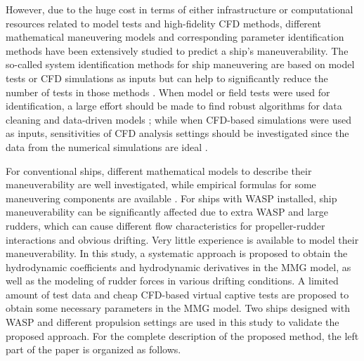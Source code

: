 However, due to the huge cost in terms of either infrastructure or computational resources related to model tests and high-fidelity CFD methods, different mathematical maneuvering models and corresponding parameter identification methods have been extensively studied to predict a ship’s maneuverability. The so-called system identification methods for ship maneuvering are based on model tests or CFD simulations as inputs but can help to significantly reduce the number of tests in those methods \citep{lokukalugep.pereraSystemIdentificationVessel2016,alexanderssonSystemIdentificationPhysicsinformed2024b}. When model or field tests were used for identification, a large effort should be made to find robust algorithms for data cleaning and data-driven models \citep{revestidoherreroTwostepIdentificationNonlinear2012,alexanderssonSystemIdentificationVessel2022,duShipManeuveringPrediction2022}; while when CFD-based simulations were used as inputs, sensitivities of CFD analysis settings should be investigated since the data from the numerical simulations are ideal \citep{liuPredictionsShipManeuverability2018}.

For conventional ships, different mathematical models to describe their maneuverability are well investigated, while empirical formulas for some maneuvering components are available \citep{yasukawaIntroductionMMGStandard2015}. For ships with WASP installed, ship maneuverability can be significantly affected due to extra WASP and large rudders, which can cause different flow characteristics for propeller-rudder interactions and obvious drifting. Very little experience is available to model their maneuverability. In this study, a systematic approach is proposed to obtain the hydrodynamic coefficients and hydrodynamic derivatives in the MMG model, as well as the modeling of rudder forces in various drifting conditions. A limited amount of test data and cheap CFD-based virtual captive tests are proposed to obtain some necessary parameters in the MMG model. Two ships designed with WASP and different propulsion settings are used in this study to validate the proposed approach. For the complete description of the proposed method, the left part of the paper is organized as follows. 

